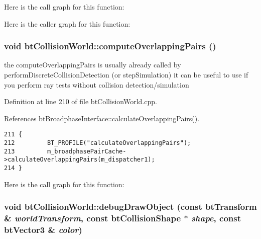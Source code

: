 Here is the call graph for this function:

Here is the caller graph for this function:\hypertarget{classbt_collision_world_fb32fb7ecb40aa6247fd3df18ba81098}{
\subsubsection[computeOverlappingPairs]{\setlength{\rightskip}{0pt plus 5cm}void btCollisionWorld::computeOverlappingPairs ()}}
\label{classbt_collision_world_fb32fb7ecb40aa6247fd3df18ba81098}


the computeOverlappingPairs is usually already called by performDiscreteCollisionDetection (or stepSimulation) it can be useful to use if you perform ray tests without collision detection/simulation 

Definition at line 210 of file btCollisionWorld.cpp.

References btBroadphaseInterface::calculateOverlappingPairs().

\begin{Code}\begin{verbatim}211 {
212         BT_PROFILE("calculateOverlappingPairs");
213         m_broadphasePairCache->calculateOverlappingPairs(m_dispatcher1);
214 }
\end{verbatim}
\end{Code}




Here is the call graph for this function:\hypertarget{classbt_collision_world_c1ca6489c220005798069152c3df0d08}{
\subsubsection[debugDrawObject]{\setlength{\rightskip}{0pt plus 5cm}void btCollisionWorld::debugDrawObject (const btTransform \& {\em worldTransform}, \/  const btCollisionShape $\ast$ {\em shape}, \/  const btVector3 \& {\em color})}}
\label{classbt_collision_world_c1ca6489c220005798069152c3df0d08}




